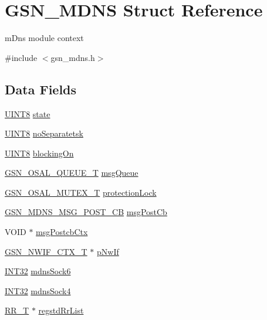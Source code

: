 \hypertarget{a00140}{
\section{GSN\_\-MDNS Struct Reference}
\label{a00140}
}


mDns module context  




{\ttfamily \#include $<$gsn\_\-mdns.h$>$}

\subsection*{Data Fields}
\begin{DoxyCompactItemize}
\item 
\hyperlink{a00660_gab27e9918b538ce9d8ca692479b375b6a}{UINT8} \hyperlink{a00140_a6e9c4cbd32a1178b12f3a61f6855c896}{state}
\item 
\hyperlink{a00660_gab27e9918b538ce9d8ca692479b375b6a}{UINT8} \hyperlink{a00140_a0bf759fe262766b44a9b023c66f75f07}{noSeparatetsk}
\item 
\hyperlink{a00660_gab27e9918b538ce9d8ca692479b375b6a}{UINT8} \hyperlink{a00140_ae88d491fc834aaae7cc9c066719d285b}{blockingOn}
\item 
\hyperlink{a00628_gaebe1c924d01bf6607bd65961bf134095}{GSN\_\-OSAL\_\-QUEUE\_\-T} \hyperlink{a00140_a3525baeed8d9f795ed0c44437f548da2}{msgQueue}
\item 
\hyperlink{a00628_gae997291afc7166c897f459023e0154ad}{GSN\_\-OSAL\_\-MUTEX\_\-T} \hyperlink{a00140_afb7d19983a90716b80a2f4dbfbf7b0c8}{protectionLock}
\item 
\hyperlink{a00668_ga9bb465f57992212c58689c8cf593e0e7}{GSN\_\-MDNS\_\-MSG\_\-POST\_\-CB} \hyperlink{a00140_a6adb3a11c7d8acfbd87e34dca64c8117}{msgPostCb}
\item 
VOID $\ast$ \hyperlink{a00140_a87ae49d5f0fac444209c04cb6498bf36}{msgPostcbCtx}
\item 
\hyperlink{a00167}{GSN\_\-NWIF\_\-CTX\_\-T} $\ast$ \hyperlink{a00140_a162db5da6960431ec48a784907bd6fb9}{pNwIf}
\item 
\hyperlink{a00660_ga63021d67d54286c2163bcdb43a6f2569}{INT32} \hyperlink{a00140_aebd7988998f79a395deb1e0738c0c3b3}{mdnsSock6}
\item 
\hyperlink{a00660_ga63021d67d54286c2163bcdb43a6f2569}{INT32} \hyperlink{a00140_aab3ddd12f9ecd58385cb87b01cd0f436}{mdnsSock4}
\item 
\hyperlink{a00457}{RR\_\-T} $\ast$ \hyperlink{a00140_a6b87b871f0ae4ed5b3264b278492b7a9}{regstdRrList}

\end{DoxyCompactItemize}
